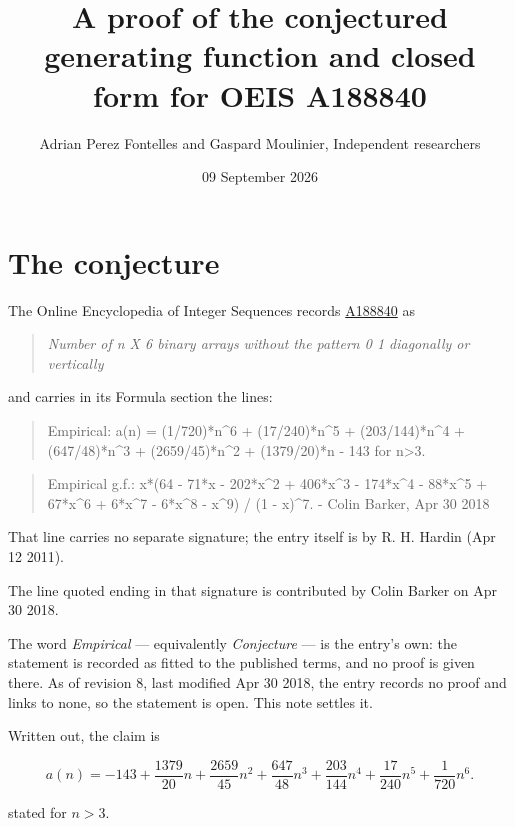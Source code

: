 \documentclass[11pt]{article}
\title{A proof of the conjectured generating function and closed form for OEIS A188840}
\author{Adrian Perez Fontelles and Gaspard Moulinier, Independent researchers}
\date{09 September 2026}
\theoremstyle{definition}
\begin{document}
\maketitle
\section{The conjecture}

The Online Encyclopedia of Integer Sequences records \href{https://oeis.org/A188840}{A188840} as

\begin{quote}\itshape Number of n X 6 binary arrays without the pattern 0 1 diagonally or vertically\end{quote}

and carries in its Formula section the lines:

\begin{quote}\ttfamily Empirical: a(n) = (1/720)*n\textasciicircum{}6 + (17/240)*n\textasciicircum{}5 + (203/144)*n\textasciicircum{}4 + (647/48)*n\textasciicircum{}3 + (2659/45)*n\textasciicircum{}2 + (1379/20)*n - 143 for n>3.\end{quote}

\begin{quote}\ttfamily Empirical g.f.: x*(64 - 71*x - 202*x\textasciicircum{}2 + 406*x\textasciicircum{}3 - 174*x\textasciicircum{}4 - 88*x\textasciicircum{}5 + 67*x\textasciicircum{}6 + 6*x\textasciicircum{}7 - 6*x\textasciicircum{}8 - x\textasciicircum{}9) / (1 - x)\textasciicircum{}7. - Colin Barker, Apr 30 2018\end{quote}

That line carries no separate signature; the entry itself is by R. H. Hardin (Apr 12 2011).

The line quoted ending in that signature is contributed by Colin Barker on Apr 30 2018.

The word {\itshape Empirical} --- equivalently {\itshape Conjecture} --- is the entry's own: the statement is recorded as fitted to the published terms, and no proof is given there. As of revision 8, last modified Apr 30 2018, the entry records no proof and links to none, so the statement is open. This note settles it.

Written out, the claim is

\[a(n) = -143 + \frac{1379}{20}n + \frac{2659}{45}n^{2} + \frac{647}{48}n^{3} + \frac{203}{144}n^{4} + \frac{17}{240}n^{5} + \frac{1}{720}n^{6}.\]

stated for $n > 3$.
\end{document}
